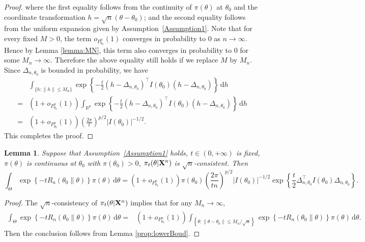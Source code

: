 \documentclass[11pt]{article}
\newcommand{\myT}{\intercal}
\theoremstyle{plain}
\newtheorem{lemma}{\quad\quad Lemma}
\theoremstyle{definition}
\theoremstyle{remark}
\begin{document}
\begin{appendices}
\begin{proof}
where the first equality follows from the continuity of $\pi(\theta)$ at $\theta_0$ and the coordinate transformation $h=\sqrt{n}(\theta-\theta_0)$;
and the second equality follows from the uniform expansion given by Assumption~\ref{Assumption1}.
Note that for every fixed $M > 0$, the term $o_{P_{\theta_0}^n}(1)$ converges in probability to $0$ as $n \to \infty$.
Hence by Lemma \ref{lemma:MN}, this term also converges in probability to $0$ for some $M_n \to \infty$.
Therefore the above equality still holds if we replace $M$ by $M_n$.
Since $\Delta_{n,\theta_0}$ is bounded in probability, we have
        $$
            \begin{aligned}
                & \int_{\{h:\|h\|\leq M_n\}}\exp\left\{ -\frac{t}{2}(h-\Delta_{n,\theta_0})^\myT  I({\theta_0})(h-\Delta_{n,\theta_0})\right\} \, \mathrm dh
                \\
                =&
                (1+o_{P^n_{\theta_0}}(1))
                \int_{\mathbb{R}^p}\exp\left\{ -\frac{t}{2}(h-\Delta_{n,\theta_0})^\myT  I({\theta_0})(h-\Delta_{n,\theta_0})\right\} \, \mathrm dh
                \\
                =&
                (1+o_{P^n_{\theta_0}}(1))
                \left(\frac{2\pi}{t}\right)^{{p}/{2}} |I({\theta_0})|^{-{1}/{2}}
.
            \end{aligned}
        $$
        This completes the proof.
     
\end{proof}




\begin{lemma}
    Suppose that Assumption~\ref{Assumption1} holds, $t\in (0,+\infty)$ is fixed,  $\pi(\theta)$ is continuous at $\theta_0$ with $\pi(\theta_0)>0$, $\pi_{t}(\theta|\mathbf{X}^{n})$ is $\sqrt{n}$-consistent.
        Then
$$
    \int_{\Theta}
    \exp\left\{-t R_n(\theta_0\| \theta) \right\} \pi(\theta)
\, \mathrm d \theta
    =
    (1+o_{P^n_{\theta_0}}(1))
    \pi(\theta_0)
    \left(\frac{2\pi}{t n}\right)^{{p}/{2}}
    |I(\theta_0)|^{-{1}/{2}} 
    \exp
    \left\{ 
        \frac{t}{2}\Delta_{n,\theta_0}^\myT  I({\theta_0})\Delta_{n,\theta_0}
\right\}
    .
$$
    \label{prop:2019rock1}
\end{lemma}
\begin{proof}
    The $\sqrt n$-consistency of $\pi_t (\theta | \mathbf{X}^n)$ implies that for any $M_n \to \infty$,
$$
\begin{aligned}
     \int_{\Theta}
     \exp\left\{ -t R_n(\theta_0\| \theta) \right\} \pi(\theta)
\, \mathrm d \theta
    =&
    (1+o_{P^n_{\theta_0}}(1))
\int_{\left\{ \theta: \|\theta - \theta_0\| \leq M_n /\sqrt n \right\}}
\exp\left\{-t R_n(\theta_0\| \theta)\right\} \pi(\theta)
\, \mathrm d \theta
.
\end{aligned}
$$
Then the conclusion follows from Lemma \ref{prop:lowerBoud}.
\end{proof}


\end{appendices}
\end{document}
